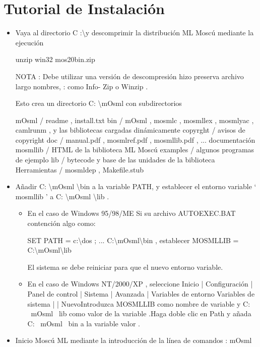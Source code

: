 \documentclass[11pt]{article} %
\begin{document}
\section{\color{red}Tutorial de Instalación}

\begin{itemize}
\item Vaya al directorio C :\textbackslash  \space y descomprimir la distribución ML Moscú
mediante la ejecución

unzip win32 mos20bin.zip

NOTA : Debe utilizar una versión de descompresión hizo preserva archivo largo
nombres, : como Info- Zip o Winzip .

Esto crea un directorio C: \textbackslash  \space mOsml con subdirectorios

mOsml / readme , install.txt
bin / mOsml , mosmlc , mosmllex , mosmlyac , camlrunm ,
y las bibliotecas cargadas dinámicamente
copyrght / avisos de copyright
doc / manual.pdf , mosmlref.pdf , mosmllib.pdf , ...
documentación mosmllib / HTML de la biblioteca ML Moscú
examples / algunos programas de ejemplo
lib / bytecode y base de las unidades de la biblioteca
Herramientas / mosmldep , Makefile.stub

\item Añadir C: \textbackslash  \space mOsml \textbackslash  \space bin a la variable PATH, y establecer el entorno
     variable ` mosmllib ' a C: \textbackslash  \space mOsml \textbackslash  \space lib .

\begin{itemize}
\item En el caso de Windows 95/98/ME Si su archivo AUTOEXEC.BAT contención algo como:

\space \space SET PATH = c:\textbackslash  \space dos ; ... C:\textbackslash  \space mOsml\textbackslash  \space bin , establecer MOSMLLIB = C:\textbackslash  \space mOsml\textbackslash  \space lib

El sistema se debe reiniciar para que el nuevo entorno variable.

\item En el caso de Windows NT/2000/XP , seleccione Inicio | Configuración | Panel de control | Sistema | Avanzada | Variables de entorno Variables de sistema | | NuevoIntroduzca MOSMLLIB como nombre de variable y C: \ mOsml \ lib como valor de la variable .Haga doble clic en Path y añada C: \ mOsml \ bin a la variable valor .

\end{itemize}

\item Inicio Moscú ML mediante la introducción de la línea de comandos : mOsml

\end{itemize}
\end{document}
